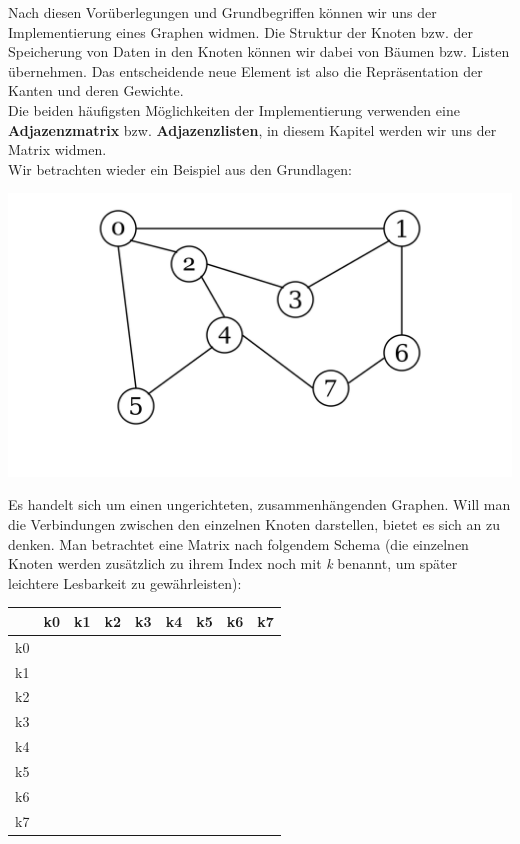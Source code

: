 \documentclass{article}
\begin{document}
Nach diesen Vorüberlegungen und Grundbegriffen können wir uns der Implementierung eines Graphen widmen. Die Struktur der Knoten bzw. der Speicherung von Daten in den Knoten können wir dabei von Bäumen bzw. Listen übernehmen. Das entscheidende neue Element ist also die Repräsentation der Kanten und deren Gewichte. \\

Die beiden häufigsten Möglichkeiten der Implementierung verwenden eine \textbf{Adjazenzmatrix} bzw. \textbf{Adjazenzlisten}, in diesem Kapitel werden wir uns der Matrix widmen. \\
Wir betrachten wieder ein Beispiel aus den Grundlagen:
\begin{center}
    \includegraphics[scale=0.15]{../media/matrix_1.png}
\end{center}
Es handelt sich um einen ungerichteten, zusammenhängenden Graphen. Will man die Verbindungen zwischen den einzelnen Knoten darstellen, bietet es sich an  zu denken. Man betrachtet eine Matrix nach folgendem Schema (die einzelnen Knoten werden zusätzlich zu ihrem Index noch mit \textit{k} benannt, um später leichtere Lesbarkeit zu gewährleisten): 
\begin{center}
\begin{tabular}{|c|c|c|c|c|c|c|c|c|}
    \hline 
        & k0 & k1 & k2 & k3 & k4 & k5 & k6 & k7  \\
    \hline 
    k0 & & & & & & & & \\
    \hline 
    k1 & & & & & & & &\\
    \hline 
    k2 & & & & & & & &\\
    \hline 
    k3 & & & & & & & &\\
    \hline 
    k4 & & & & & & & &\\
    \hline 
    k5 & & & & & & & &\\
    \hline 
    k6 & & & & & & & &\\
    \hline 
    k7 & & & & & & & &\\
    \hline 
\end{tabular} 
\end{center}
\end{document}
